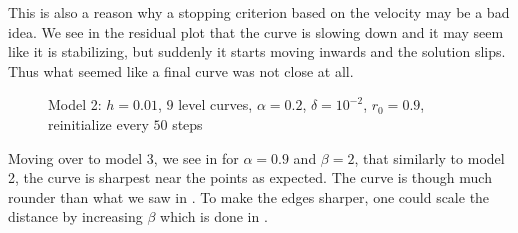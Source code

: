 This is also a reason why a stopping criterion based on the velocity may be a bad idea. We see in the residual plot that the curve is slowing down and it may seem like it is stabilizing, but suddenly it starts moving inwards and the solution slips. Thus what seemed like a final curve was not close at all.

\begin{figure}
\begin{center}
\end{center}
\vspace{-2.5em}
\caption[Model 2 - Triangle, $\alpha=0.2$]{Model 2: $h=0.01$, $9$ level curves, $\alpha=0.2$, $\delta=10^{-2}$, $r_0=0.9$, reinitialize every $50$ steps}
\label{fig:m2-threepoints-02}
\end{figure}


Moving over to model 3, we see in  for $\alpha=0.9$ and $\beta=2$, that similarly to model 2, the curve is sharpest near the points as expected. The curve is though much rounder than what we saw in . To make the edges sharper, one could scale the distance by increasing $\beta$ which is done in .

